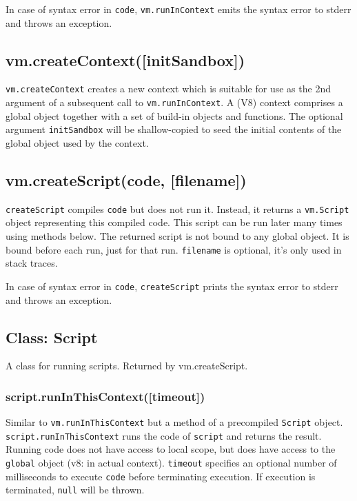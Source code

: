 In case of syntax error in \texttt{code}, \texttt{vm.runInContext} emits
the syntax error to stderr and throws an exception.

\subsection{vm.createContext({[}initSandbox{]})}

\texttt{vm.createContext} creates a new context which is suitable for
use as the 2nd argument of a subsequent call to
\texttt{vm.runInContext}. A (V8) context comprises a global object
together with a set of build-in objects and functions. The optional
argument \texttt{initSandbox} will be shallow-copied to seed the initial
contents of the global object used by the context.

\subsection{vm.createScript(code, {[}filename{]})}

\texttt{createScript} compiles \texttt{code} but does not run it.
Instead, it returns a \texttt{vm.Script} object representing this
compiled code. This script can be run later many times using methods
below. The returned script is not bound to any global object. It is
bound before each run, just for that run. \texttt{filename} is optional,
it's only used in stack traces.

In case of syntax error in \texttt{code}, \texttt{createScript} prints
the syntax error to stderr and throws an exception.

\subsection{Class: Script}

A class for running scripts. Returned by vm.createScript.

\subsubsection{script.runInThisContext({[}timeout{]})}

Similar to \texttt{vm.runInThisContext} but a method of a precompiled
\texttt{Script} object. \texttt{script.runInThisContext} runs the code
of \texttt{script} and returns the result. Running code does not have
access to local scope, but does have access to the \texttt{global}
object (v8: in actual context). \texttt{timeout} specifies an optional
number of milliseconds to execute \texttt{code} before terminating
execution. If execution is terminated, \texttt{null} will be thrown.

